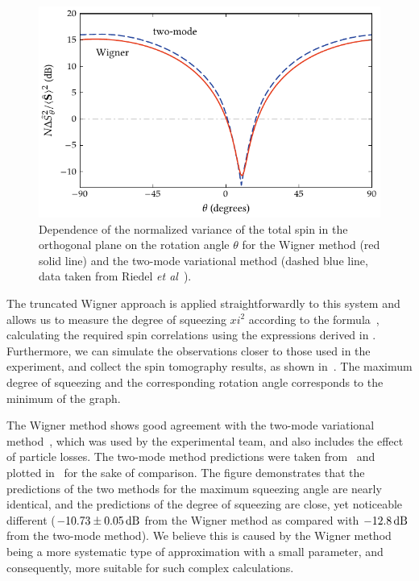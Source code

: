 \begin{figure}
    \centerline{\includegraphics{figures_generated/bec_squeezing/riedel_rotation.pdf}}

    \caption[Wigner simulated spin tomography in the component separation experiment]{
    Dependence of the normalized variance of the total spin in the orthogonal plane on the rotation angle $\theta$ for the Wigner method (red solid line) and the two-mode variational method (dashed blue line, data taken from Riedel \textit{et al}~\cite{Riedel2010}).
    }%
    \label{fig:bec-squeezing:separation:tomography}
\end{figure}

The truncated Wigner approach is applied straightforwardly to this system and allows us to measure the degree of squeezing $xi^2$ according to the formula~, calculating the required spin correlations using the expressions derived in .
Furthermore, we can simulate the observations closer to those used in the experiment, and collect the spin tomography results, as shown in~.
The maximum degree of squeezing and the corresponding rotation angle corresponds to the minimum of the graph.

The Wigner method shows good agreement with the two-mode variational method~\cite{Li2009}, which was used by the experimental team, and also includes the effect of particle losses.
The two-mode method predictions were taken from~\cite{Riedel2010} and plotted in~ for the sake of comparison.
The figure demonstrates that the predictions of the two methods for the maximum squeezing angle are nearly identical, and the predictions of the degree of squeezing are close, yet noticeable different ($-10.73\pm0.05\mbox{\ensuremath{\,\mathrm{dB}}}$ from the Wigner method as compared with $-12.8\mbox{\ensuremath{\,\mathrm{dB}}}$ from the two-mode method).
We believe this is caused by the Wigner method being a more systematic type of approximation with a small parameter, and consequently, more suitable for such complex calculations.

